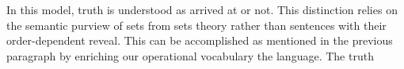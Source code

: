 \documentclass[12pt]{article}
\begin{document}
In this model, truth is understood as arrived at or not. This distinction
relies on the semantic purview of sets from sets theory rather than sentences
with their order-dependent reveal. This can be accomplished as mentioned in the
previous paragraph by enriching our operational vocabulary the language. The truth
\end{document}
